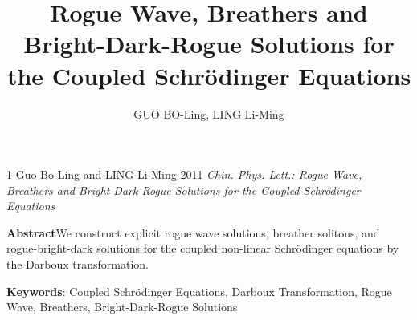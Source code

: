 \documentclass[11pt,a4paper]{ctexart}
\begin{document}
%

\begin{thebibliography}{1}
	Guo Bo-Ling and LING Li-Ming 2011 \textit{Chin. Phys. Lett.: Rogue Wave, Breathers and Bright-Dark-Rogue Solutions for the Coupled Schr\"{o}dinger Equations}
\end{thebibliography}

\title{Rogue Wave, Breathers and Bright-Dark-Rogue Solutions for the Coupled Schr\"{o}dinger Equations}
\author{GUO BO-Ling, LING Li-Ming\\}
\maketitle

\noindent \textbf{Abstract}We construct explicit rogue wave solutions, breather solitons, and rogue-bright-dark solutions for the coupled non-linear Schr\"{o}dinger equations by the Darboux transformation.

\noindent \textbf{Keywords}: Coupled Schr\"{o}dinger Equations, Darboux Transformation, Rogue Wave, Breathers, Bright-Dark-Rogue Solutions
\end{document}
